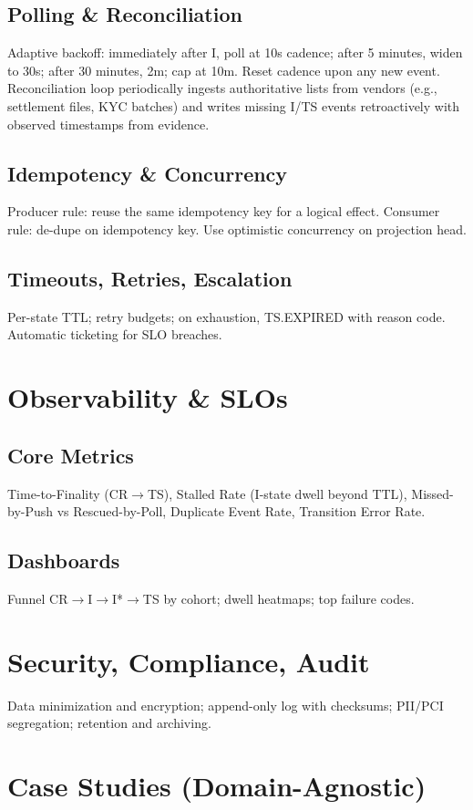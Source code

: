 \documentclass[11pt]{article}
\begin{document}
\subsection{Polling \& Reconciliation}
Adaptive backoff: immediately after I, poll at 10s cadence; after 5 minutes, widen to 30s; after 30 minutes, 2m; cap at 10m. Reset cadence upon any new event.
Reconciliation loop periodically ingests authoritative lists from vendors (e.g., settlement files, KYC batches) and writes missing I/TS events retroactively with observed timestamps from evidence.

\subsection{Idempotency \& Concurrency}
Producer rule: reuse the same idempotency key for a logical effect. Consumer rule: de-dupe on idempotency key. Use optimistic concurrency on projection head.

\subsection{Timeouts, Retries, Escalation}
Per-state TTL; retry budgets; on exhaustion, TS.EXPIRED with reason code. Automatic ticketing for SLO breaches.

\section{Observability \& SLOs}
\subsection{Core Metrics}
Time-to-Finality (CR$\to$TS), Stalled Rate (I-state dwell beyond TTL), Missed-by-Push vs Rescued-by-Poll, Duplicate Event Rate, Transition Error Rate.
\subsection{Dashboards}
Funnel CR$\to$I$\to$I*$\to$TS by cohort; dwell heatmaps; top failure codes.

\section{Security, Compliance, Audit}
Data minimization and encryption; append-only log with checksums; PII/PCI segregation; retention and archiving.

\section{Case Studies (Domain-Agnostic)}
\end{document}
